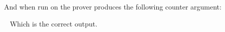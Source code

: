 And when run on the prover produces the following counter argument\+:

{}

{ } ~\newline
 Which is the correct output. 